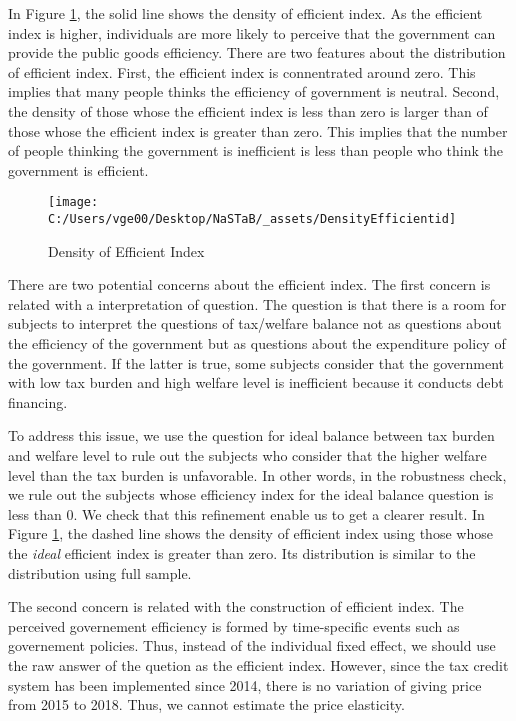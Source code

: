 \documentclass[ review  , 3p ]{elsarticle}
\begin{document}
  In Figure \ref{fig:showDensityEfficientIndex}, the solid line shows the density of efficient index.
  As the efficient index is higher,
  individuals are more likely to perceive that the government can provide the public goods efficiency.
  There are two features about the distribution of efficient index.
  First, the efficient index is connentrated around zero.
  This implies that many people thinks the efficiency of government is neutral.
  Second, the density of those whose the efficient index is less than zero is larger than of
  those whose the efficient index is greater than zero.
  This implies that the number of people thinking the government is inefficient is
  less than people who think the government is efficient.

  \begin{figure}[t]

  {\centering \texttt{[image: C:/Users/vge00/Desktop/NaSTaB/\_assets/DensityEfficientid]} 

  }

  \caption{Density of Efficient Index}\label{fig:showDensityEfficientIndex}
  \end{figure}

  There are two potential concerns about the efficient index.
  The first concern is related with a interpretation of question.
  The question is that
  there is a room for subjects to interpret the questions of tax/welfare balance
  not as questions about the efficiency of the government
  but as questions about the expenditure policy of the government.
  If the latter is true,
  some subjects consider that the government with low tax burden and high welfare level is inefficient because
  it conducts debt financing.

  To address this issue,
  we use the question for ideal balance between tax burden and welfare level
  to rule out the subjects who consider that the higher welfare level than the tax burden is unfavorable.
  In other words, in the robustness check,
  we rule out the subjects whose efficiency index for the ideal balance question is less than 0.
  We check that this refinement enable us to get a clearer result.
  In Figure \ref{fig:showDensityEfficientIndex},
  the dashed line shows the density of efficient index
  using those whose the \emph{ideal} efficient index is greater than zero.
  Its distribution is similar to the distribution using full sample.

  The second concern is related with the construction of efficient index.
  The perceived governement efficiency is formed by time-specific events such as governement policies.
  Thus, instead of the individual fixed effect,
  we should use the raw answer of the quetion as the efficient index.
  However, since the tax credit system has been implemented since 2014,
  there is no variation of giving price from 2015 to 2018.
  Thus, we cannot estimate the price elasticity.
\end{document}
